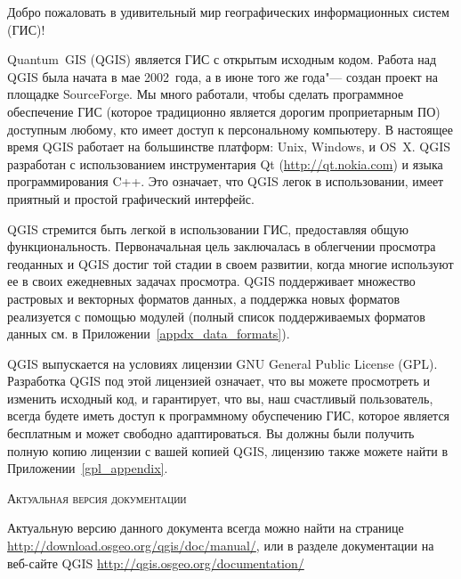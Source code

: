 \mainmatter
\pagestyle{scrheadings}
\label{label_forward}
\setcounter{page}{1}



Добро пожаловать в удивительный мир географических информационных систем
(ГИС)!

Quantum~GIS (QGIS) является ГИС с открытым исходным кодом. Работа
над QGIS была начата в мае 2002~года, а в июне того же года"--- создан
проект на площадке SourceForge. Мы много работали, чтобы сделать
программное обеспечение ГИС (которое традиционно является дорогим
проприетарным ПО) доступным любому, кто имеет
доступ к персональному компьютеру. В настоящее время QGIS работает на
большинстве платформ: Unix, Windows, и OS~X. QGIS разработан с
использованием инструментария Qt (\url{http://qt.nokia.com}) и языка
программирования C++.
Это означает, что QGIS легок в использовании, имеет приятный и простой
графический интерфейс.

QGIS стремится быть легкой в использовании ГИС, предоставляя общую
функциональность. Первоначальная цель заключалась в облегчении
просмотра геоданных и QGIS достиг той стадии в своем развитии, когда
многие используют ее в своих ежедневных задачах просмотра.
QGIS поддерживает множество растровых и векторных форматов данных, а
поддержка новых форматов реализуется с помощью модулей (полный список
поддерживаемых форматов данных см. в Приложении~\ref{appdx_data_formats}).

QGIS выпускается на условиях лицензии GNU General Public License (GPL).
Разработка QGIS под этой лицензией означает, что вы можете просмотреть и
изменить исходный код, и гарантирует, что вы, наш счастливый
пользователь, всегда будете иметь доступ к программному обуспечению ГИС,
которое является бесплатным и может свободно адаптироваться. Вы должны
были получить полную копию лицензии с вашей копией QGIS, лицензию также
можете найти в Приложении~\ref{gpl_appendix}.

\begin{Tip}\caption{\textsc{Актуальная версия документации}}
Актуальную версию данного документа всегда можно найти на странице
\url{http://download.osgeo.org/qgis/doc/manual/}, или в разделе
документации на веб-сайте QGIS \url{http://qgis.osgeo.org/documentation/}
\end{Tip}


